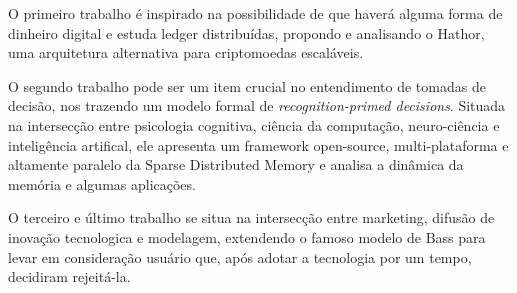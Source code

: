 O primeiro trabalho é inspirado na possibilidade de que haverá alguma forma de dinheiro digital e estuda ledger distribuídas, propondo e analisando o Hathor, uma arquitetura alternativa para criptomoedas escaláveis.

O segundo trabalho pode ser um item crucial no entendimento de tomadas de decisão, nos trazendo um modelo formal de \emph{recognition-primed decisions}. Situada na intersecção entre psicologia cognitiva, ciência da computação, neuro-ciência e inteligência artifical, ele apresenta um framework open-source, multi-plataforma e altamente paralelo da Sparse Distributed Memory e analisa a dinâmica da memória e algumas aplicações.

O terceiro e último trabalho se situa na intersecção entre marketing, difusão de inovação tecnologica e modelagem, extendendo o famoso modelo de Bass para levar em consideração usuário que, após adotar a tecnologia por um tempo, decidiram rejeitá-la.

\endgroup

